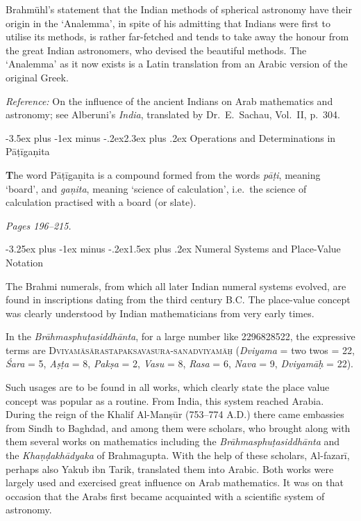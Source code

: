 \documentclass[11pt,a4paper]{article}
\makeatletter
\renewcommand{\section}{\@startsection {section}{1}{\z@}%
  {-3.5ex plus -1ex minus -.2ex}{2.3ex plus .2ex}%
  {\normalfont\Large\bfseries\color{sectioncolor}}}
\renewcommand{\subsection}{\@startsection{subsection}{2}{\z@}%
  {-3.25ex plus -1ex minus -.2ex}{1.5ex plus .2ex}%
  {\normalfont\large\bfseries\color{sectioncolor}}}
\newcommand{\cnote}[1]{\textcolor{notecolor}{\textit{#1}}}
\makeatother
\begin{document}
Brahmühl's statement that the Indian methods of spherical astronomy have their origin in the `Analemma', in spite of his admitting that Indians were first to utilise its methods, is rather far-fetched and tends to take away the honour from the great Indian astronomers, who devised the beautiful methods. The `Analemma' as it now exists is a Latin translation from an Arabic version of the original Greek.

\cnote{Reference:} On the influence of the ancient Indians on Arab mathematics and astronomy; see Alberuni's \textit{India}, translated by Dr.\ E.\ Sachau, Vol.\ II, p.\ 304.

\section{Operations and Determinations in Pāṭīgaṇita}
\label{sec:patiganita}

\textbf{T}he word Pāṭīgaṇita is a compound formed from the words \textit{pāṭi}, meaning `board', and \textit{gaṇita}, meaning `science of calculation', i.e.\ the science of calculation practised with a board (or slate).

\cnote{Pages 196--215.}

\subsection{Numeral Systems and Place-Value Notation}

The Brahmi numerals, from which all later Indian numeral systems evolved, are found in inscriptions dating from the third century B.C. The place-value concept was clearly understood by Indian mathematicians from very early times.

In the \textit{Brāhmasphuṭasiddhānta}, for a large number like 2296828522, the expressive terms are \textsc{Dviyamāsārastapaksavasura-sanadviyamāḥ} (\textit{Dviyama} = two twos = 22, \textit{Śara} = 5, \textit{Aṣṭa} = 8, \textit{Pakṣa} = 2, \textit{Vasu} = 8, \textit{Rasa} = 6, \textit{Nava} = 9, \textit{Dviyamāḥ} = 22).

Such usages are to be found in all works, which clearly state the place value concept was popular as a routine. From India, this system reached Arabia. During the reign of the Khalif Al-Manṣūr (753--774 A.D.) there came embassies from Sindh to Baghdad, and among them were scholars, who brought along with them several works on mathematics including the \textit{Brāhmasphuṭasiddhānta} and the \textit{Khaṇḍakhādyaka} of Brahmagupta. With the help of these scholars, Al-fazarī, perhaps also Yakub ibn Tarik, translated them into Arabic. Both works were largely used and exercised great influence on Arab mathematics. It was on that occasion that the Arabs first became acquainted with a scientific system of astronomy.
\end{document}
